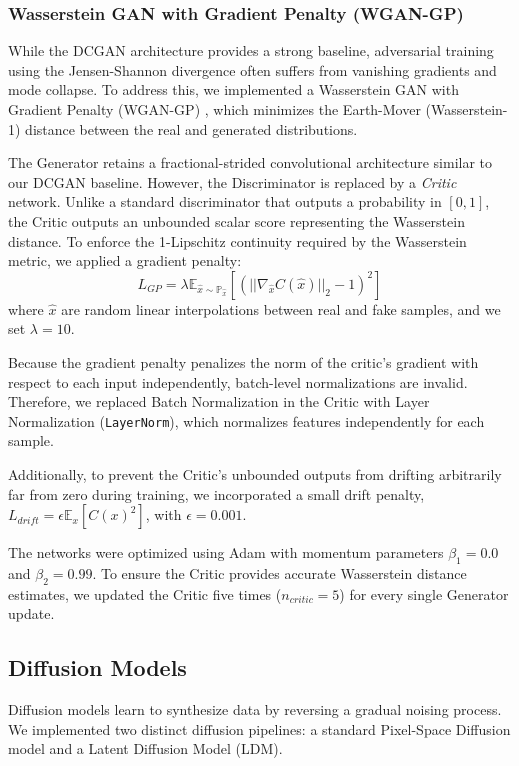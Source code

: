 \documentclass[runningheads]{llncs}
\begin{document}
\subsubsection{Wasserstein GAN with Gradient Penalty (WGAN-GP)}
While the DCGAN architecture provides a strong baseline, adversarial training using the Jensen-Shannon divergence often suffers from vanishing gradients and mode collapse. To address this, we implemented a Wasserstein GAN with Gradient Penalty (WGAN-GP) \cite{gulrajani2017improved}, which minimizes the Earth-Mover (Wasserstein-1) distance between the real and generated distributions.

The Generator retains a fractional-strided convolutional architecture similar to our DCGAN baseline. However, the Discriminator is replaced by a \textit{Critic} network. Unlike a standard discriminator that outputs a probability in $[0, 1]$, the Critic outputs an unbounded scalar score representing the Wasserstein distance. To enforce the 1-Lipschitz continuity required by the Wasserstein metric, we applied a gradient penalty:
\begin{equation}
    L_{GP} = \lambda \mathbb{E}_{\hat{x} \sim \mathbb{P}_{\hat{x}}} \left[ \left( ||\nabla_{\hat{x}} C(\hat{x})||_2 - 1 \right)^2 \right]
\end{equation}
where $\hat{x}$ are random linear interpolations between real and fake samples, and we set $\lambda = 10$. 

Because the gradient penalty penalizes the norm of the critic's gradient with respect to each input independently, batch-level normalizations are invalid. Therefore, we replaced Batch Normalization in the Critic with Layer Normalization (\texttt{LayerNorm}), which normalizes features independently for each sample.

Additionally, to prevent the Critic's unbounded outputs from drifting arbitrarily far from zero during training, we incorporated a small drift penalty, $L_{drift} = \epsilon \mathbb{E}_{x}[C(x)^2]$, with $\epsilon = 0.001$. 

The networks were optimized using Adam with momentum parameters $\beta_1=0.0$ and $\beta_2=0.99$. To ensure the Critic provides accurate Wasserstein distance estimates, we updated the Critic five times ($n_{critic} = 5$) for every single Generator update.


\subsection{Diffusion Models}
Diffusion models learn to synthesize data by reversing a gradual noising process. We implemented two distinct diffusion pipelines: a standard Pixel-Space Diffusion model and a Latent Diffusion Model (LDM). 
\end{document}
